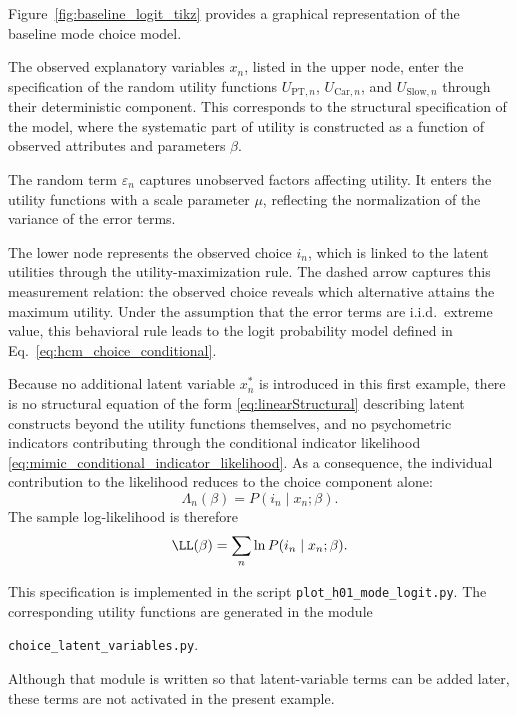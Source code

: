 \documentclass[12pt,a4paper]{article}
\let\OrigUnderscore\_
\def\_{\OrigUnderscore\penalty0\hspace{0pt}}%
\begin{document}
Figure~\ref{fig:baseline_logit_tikz} provides a graphical
representation of the baseline mode choice model.

The observed explanatory variables \(x_n\), listed in the upper node,
enter the specification of the random utility functions
\(U_{\mathrm{PT},n}\), \(U_{\mathrm{Car},n}\), and
\(U_{\mathrm{Slow},n}\) through their deterministic component. This
corresponds to the structural specification of the model, where the
systematic part of utility is constructed as a function of observed
attributes and parameters \(\beta\).

The random term \(\varepsilon_n\)
captures unobserved factors affecting utility. It enters the utility
functions with a scale parameter \(\mu\), reflecting the normalization
of the variance of the error terms.

The lower node represents the observed choice \(i_n\), which is linked
to the latent utilities through the utility-maximization rule. The
dashed arrow captures this measurement relation: the observed choice
reveals which alternative attains the maximum utility. Under the
assumption that the error terms are i.i.d.\ extreme value, this
behavioral rule leads to the logit probability model defined in
Eq.~\eqref{eq:hcm_choice_conditional}.

Because no additional latent variable \(x_n^*\) is introduced in this
first example, there is no structural equation of the form
\eqref{eq:linearStructural} describing latent constructs beyond the
utility functions themselves, and no psychometric indicators
contributing through the conditional indicator likelihood
\eqref{eq:mimic_conditional_indicator_likelihood}.  As a consequence,
the individual contribution to the likelihood reduces to the choice
component alone:
\begin{equation}
  \label{eq:example1_likelihood}
  \Lambda_n(\beta) = P(i_n \mid x_n;\beta).
\end{equation}
The sample log-likelihood is therefore
\begin{equation}
  \label{eq:example1_loglikelihood}
  \LL(\beta) = \sum_n \ln P(i_n \mid x_n;\beta).
\end{equation}

This specification is implemented in the script
\texttt{plot\_h01\_mode\_logit.py}. The corresponding utility
functions are generated in the module
\begin{center}
  \texttt{choice\_latent\_variables.py}.
\end{center}
Although that module is written
so that latent-variable terms can be added later, these terms are not
activated in the present example.
\end{document}
